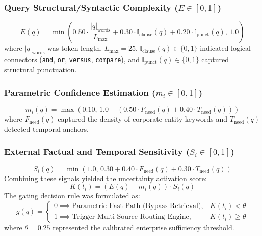 \documentclass[conference,onecolumn,10pt]{IEEEtran}
\begin{document}
\subsubsection{Query Structural/Syntactic Complexity ($E \in [0, 1]$)}
\begin{equation}
    E(q) = \min\left( 0.50 \cdot \frac{|q|_{\text{words}}}{L_{\text{max}}} + 0.30 \cdot \mathbb{I}_{\text{clause}}(q) + 0.20 \cdot \mathbb{I}_{\text{punct}}(q), \, 1.0 \right)
    \label{eq:complexity_e}
\end{equation}
where $|q|_{\text{words}}$ was token length, $L_{\text{max}} = 25$, $\mathbb{I}_{\text{clause}}(q) \in \{0, 1\}$ indicated logical connectors (\texttt{and}, \texttt{or}, \texttt{versus}, \texttt{compare}), and $\mathbb{I}_{\text{punct}}(q) \in \{0, 1\}$ captured structural punctuation.

\subsubsection{Parametric Confidence Estimation ($m_i \in [0, 1]$)}
\begin{equation}
    m_i(q) = \max\left( 0.10, \, 1.0 - \left( 0.50 \cdot F_{\text{need}}(q) + 0.40 \cdot T_{\text{need}}(q) \right) \right)
    \label{eq:confidence_m}
\end{equation}
where $F_{\text{need}}(q)$ captured the density of corporate entity keywords and $T_{\text{need}}(q)$ detected temporal anchors.

\subsubsection{External Factual and Temporal Sensitivity ($S_i \in [0, 1]$)}
\begin{equation}
    S_i(q) = \min\left( 1.0, \, 0.30 + 0.40 \cdot F_{\text{need}}(q) + 0.30 \cdot T_{\text{need}}(q) \right)
    \label{eq:urgency_s}
\end{equation}
Combining these signals yielded the uncertainty activation score:
\begin{equation}
    K(t_i) = \left( E(q) - m_i(q) \right) \cdot S_i(q)
    \label{eq:k_activation}
\end{equation}
The gating decision rule was formulated as:
\begin{equation}
    g(q) = \begin{cases} 
      0 \implies \text{Parametric Fast-Path (Bypass Retrieval)}, & K(t_i) < \theta \\
      1 \implies \text{Trigger Multi-Source Routing Engine}, & K(t_i) \ge \theta
   \end{cases}
   \label{eq:gating_rule}
\end{equation}
where $\theta = 0.25$ represented the calibrated enterprise sufficiency threshold.
\end{document}
